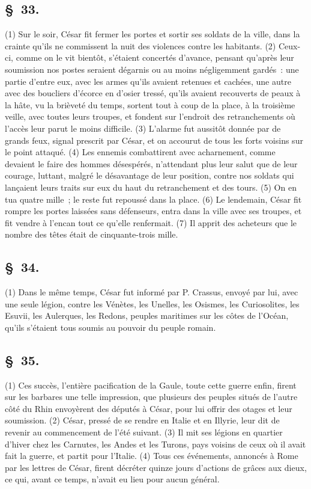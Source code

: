 \documentclass[french,twoside]{book} %
\begin{document}
\subsection[{§ 33.}]{ \textsc{§ 33.} }
\noindent (1) Sur le soir, César fit fermer les portes et sortir ses soldats de la ville, dans la crainte qu’ils ne commissent la nuit des violences contre les habitants. (2) Ceux-ci, comme on le vit bientôt, s’étaient concertés d’avance, pensant qu’après leur soumission nos postes seraient dégarnis ou au moins négligemment gardés : une partie d’entre eux, avec les armes qu’ils avaient retenues et cachées, une autre avec des boucliers d’écorce en d’osier tressé, qu’ils avaient recouverts de peaux à la hâte, vu la brièveté du temps, sortent tout à coup de la place, à la troisième veille, avec toutes leurs troupes, et fondent sur l’endroit des retranchements où l’accès leur parut le moins difficile. (3) L'alarme fut aussitôt donnée par de grands feux, signal prescrit par César, et on accourut de tous les forts voisins sur le point attaqué. (4) Les ennemis combattirent avec acharnement, comme devaient le faire des hommes désespérés, n’attendant plus leur salut que de leur courage, luttant, malgré le désavantage de leur position, contre nos soldats qui lançaient leurs traits sur eux du haut du retranchement et des tours. (5) On en tua quatre mille ; le reste fut repoussé dans la place. (6) Le lendemain, César fit rompre les portes laissées sans défenseurs, entra dans la ville avec ses troupes, et fit vendre à l’encan tout ce qu’elle renfermait. (7) Il apprit des acheteurs que le nombre des têtes était de cinquante-trois mille.
\subsection[{§ 34.}]{ \textsc{§ 34.} }
\noindent (1) Dans le même temps, César fut informé par P. Crassus, envoyé par lui, avec une seule légion, contre les Vénètes, les Unelles, les Osismes, les Curiosolites, les Esuvii, les Aulerques, les Redons, peuples maritimes sur les côtes de l’Océan, qu’ils s’étaient tous soumis au pouvoir du peuple romain.
\subsection[{§ 35.}]{ \textsc{§ 35.} }
\noindent (1) Ces succès, l’entière pacification de la Gaule, toute cette guerre enfin, firent sur les barbares une telle impression, que plusieurs des peuples situés de l’autre côté du Rhin envoyèrent des députés à César, pour lui offrir des otages et leur soumission. (2) César, pressé de se rendre en Italie et en Illyrie, leur dit de revenir au commencement de l’été suivant. (3) Il mit ses légions en quartier d’hiver chez les Carnutes, les Andes et les Turons, pays voisins de ceux où il avait fait la guerre, et partit pour l’Italie. (4) Tous ces événements, annoncés à Rome par les lettres de César, firent décréter quinze jours d’actions de grâces aux dieux, ce qui, avant ce temps, n’avait eu lieu pour aucun général.
\end{document}
